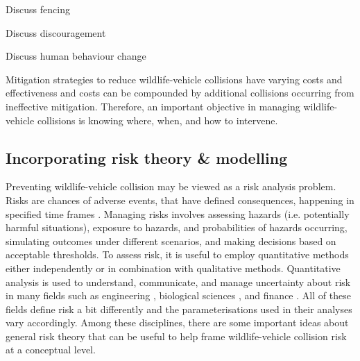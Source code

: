 Discuss fencing

Discuss discouragement

Discuss human behaviour change

Mitigation strategies to reduce wildlife-vehicle collisions have varying costs and effectiveness \citep{huij09} and costs can be compounded by additional collisions occurring from ineffective mitigation. Therefore, an important objective in managing wildlife-vehicle collisions is knowing where, when, and how to intervene.



\subsection{Incorporating risk theory \& modelling}

Preventing wildlife-vehicle collision may be viewed as a risk analysis problem. Risks are chances of adverse events, that have defined consequences, happening in specified time frames \citep{burg05}. Managing risks involves assessing hazards (i.e. potentially harmful situations), exposure to hazards, and probabilities of hazards occurring, simulating outcomes under different scenarios, and making decisions based on acceptable thresholds. To assess risk, it is useful to employ quantitative methods either independently or in combination with qualitative methods. Quantitative analysis is used to understand, communicate, and manage uncertainty about risk in many fields such as engineering \citep{apos04}, biological sciences \citep{sute16}, and finance \citep{mcne15}.  All of these fields define risk a bit differently and the parameterisations used in their analyses vary accordingly. Among these disciplines, there are some important ideas about general risk theory that can be useful to help frame wildlife-vehicle collision risk at a conceptual level.

